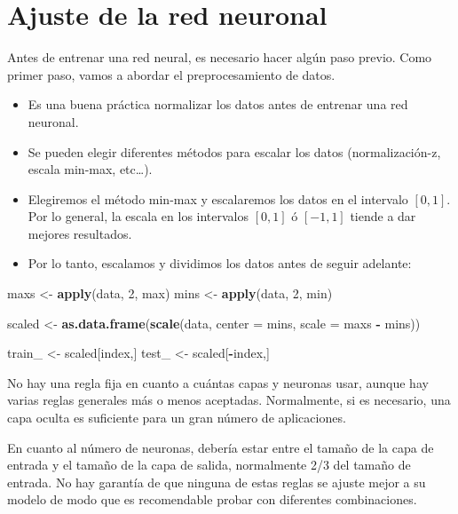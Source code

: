 \documentclass[]{book}
\newenvironment{Shaded}{\begin{snugshade}}{\end{snugshade}}
\newcommand{\KeywordTok}[1]{\textcolor[rgb]{0.13,0.29,0.53}{\textbf{#1}}}
\newcommand{\DataTypeTok}[1]{\textcolor[rgb]{0.13,0.29,0.53}{#1}}
\newcommand{\DecValTok}[1]{\textcolor[rgb]{0.00,0.00,0.81}{#1}}
\newcommand{\StringTok}[1]{\textcolor[rgb]{0.31,0.60,0.02}{#1}}
\newcommand{\OperatorTok}[1]{\textcolor[rgb]{0.81,0.36,0.00}{\textbf{#1}}}
\newcommand{\NormalTok}[1]{#1}
\begin{document}
\section{Ajuste de la red neuronal}\label{ajuste-de-la-red-neuronal}

Antes de entrenar una red neural, es necesario hacer algún paso previo.
Como primer paso, vamos a abordar el preprocesamiento de datos.

\begin{itemize}
\item
  Es una buena práctica normalizar los datos antes de entrenar una red
  neuronal.
\item
  Se pueden elegir diferentes métodos para escalar los datos
  (normalización-z, escala min-max, etc\ldots{}).
\item
  Elegiremos el método min-max y escalaremos los datos en el intervalo
  \([0,1]\). Por lo general, la escala en los intervalos \([0,1]\) ó
  \([-1,1]\) tiende a dar mejores resultados.
\item
  Por lo tanto, escalamos y dividimos los datos antes de seguir
  adelante:
\end{itemize}

\begin{Shaded}
\begin{Highlighting}[]
\NormalTok{maxs <-}\StringTok{ }\KeywordTok{apply}\NormalTok{(data, }\DecValTok{2}\NormalTok{, max)}
\NormalTok{mins <-}\StringTok{ }\KeywordTok{apply}\NormalTok{(data, }\DecValTok{2}\NormalTok{, min)}

\NormalTok{scaled <-}\StringTok{ }\KeywordTok{as.data.frame}\NormalTok{(}\KeywordTok{scale}\NormalTok{(data, }\DataTypeTok{center =}\NormalTok{ mins, }\DataTypeTok{scale =}\NormalTok{ maxs }\OperatorTok{-}\StringTok{ }\NormalTok{mins))}

\NormalTok{train_ <-}\StringTok{ }\NormalTok{scaled[index,]}
\NormalTok{ test_ <-}\StringTok{ }\NormalTok{scaled[}\OperatorTok{-}\NormalTok{index,]}
\end{Highlighting}
\end{Shaded}

No hay una regla fija en cuanto a cuántas capas y neuronas usar, aunque
hay varias reglas generales más o menos aceptadas. Normalmente, si es
necesario, una capa oculta es suficiente para un gran número de
aplicaciones.

En cuanto al número de neuronas, debería estar entre el tamaño de la
capa de entrada y el tamaño de la capa de salida, normalmente 2/3 del
tamaño de entrada. No hay garantía de que ninguna de estas reglas se
ajuste mejor a su modelo de modo que es recomendable probar con
diferentes combinaciones.
\end{document}
